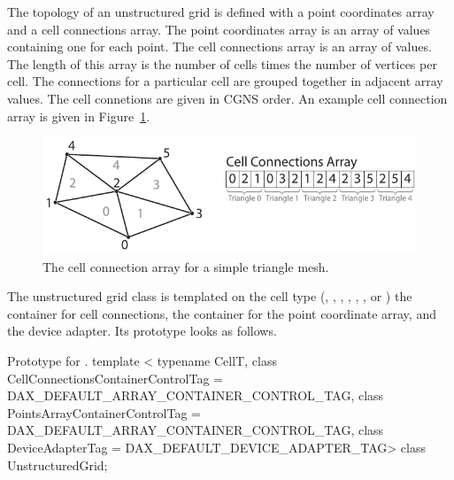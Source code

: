 The topology of an unstructured grid is defined with a point coordinates
array and a cell connections array. The point coordinates array is an array
of  values containing one for each point. The cell connections
array is an array of  values. The length of this array is the
number of cells times the number of vertices per cell. The connections for
a particular cell are grouped together in adjacent array values. The cell
connetions are given in CGNS order. An example cell connection
array is given in Figure~\ref{fig:CellConnections}.

\begin{figure}[htb]
  \centering
  \includegraphics{images/CellConnections}
  \caption{The cell connection array for a simple triangle mesh.}
  \label{fig:CellConnections}
\end{figure}

The unstructured grid class is templated on the cell type
(, , ,
, , , or
) the container for cell connections, the container for
the point coordinate array, and the device adapter. Its prototype looks as
follows.

\begin{daxexample}{Prototype for \protect{}.}
template <
    typename CellT,
    class CellConnectionsContainerControlTag = DAX_DEFAULT_ARRAY_CONTAINER_CONTROL_TAG,
    class PointsArrayContainerControlTag = DAX_DEFAULT_ARRAY_CONTAINER_CONTROL_TAG,
    class DeviceAdapterTag = DAX_DEFAULT_DEVICE_ADAPTER_TAG>
class UnstructuredGrid;
\end{daxexample}

